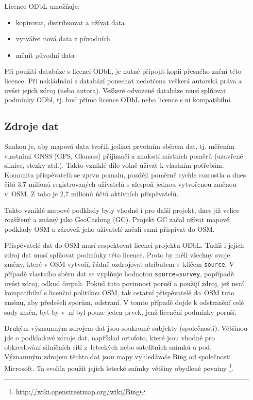 Licence ODbL umožňuje:
\begin{itemize}
    \item    kopírovat, distribuovat a užívat data
    \item    vytvářet nová data z původních
    \item    měnit původní data
\end{itemize}

Při použití databáze s licencí ODbL, je
nutné připojit kopii přesného znění této licence.
Při nakládnání s databází ponechat nedotčena veškerá autorská práva a
uvést jejich zdroj (nebo autora).
Veškeré odvozené databáze musí splňovat podmínky ODbl,
tj. buď přímo licence ODbL nebo licence s ní kompatibilní. \cite{ODbLv1}


\subsection{Zdroje dat}
\label{Zdroje dat}
Snahou je, aby mapová data tvořili jedinci prvotním
sběrem dat, tj. měřením vlastními GNSS (GPS, Glonass) přijímači a
znalostí místních poměrů (uzavřené silnice, stezky atd.).  Takto
vzniklé dílo volně užívat k vlastním potřebám. Komunita přispěvatelů se
zprvu pomalu, později poměrně rychle rozrostla a dnes čítá 3,7 milionů
registrovaných uživatelů s alespoň jednou vytvořenou změnou v~OSM. Z toho je 2,7 milionů účtů aktivních přispěvatelů.\cite{OSMstats}

Takto vzniklé mapové podklady byly vhodné i pro další projekt, dnes již
velice rozšířený a známý jako GeoCashing (GC). Projekt GC začal užívat mapové
podklady OSM a zároveň jeho uživatelé začali sami přispívat do OSM. 

Přispěvatelé dat do OSM musí respektovat licenci projektu ODbL.
Tudíž i jejich zdroj dat musí splňovat podmínky této licence.
Proto by měli
všechny svoje změny, které v OSM vytvoří, řádně ozdrojovat atributem
s~klíčem 
{\tt source}.
V případě vlastního sběru dat se vyplňuje hodnotou
{\tt source=survey},
popřípadě uvést zdroj, odkud čerpali. Pokud tuto povinnost poruší a
použijí zdroj, jež není kompatibilní s licenční politikou OSM, tak ostatní 
přispěvatelé do~OSM tuto změnu, aby předešeli sporům, odstraní. 
V tomto případě dojde k odstranění celé sady změn, byť by v~ní byl pouze jeden prvek, jenž licenční podmínky poruší.

Druhým významným zdrojem dat jsou soukromé subjekty (společnosti).
Většinou jde o podkladové zdroje dat, například ortofoto, které jsou
vhodné pro obkreslování silničních sítí z~leteckých nebo
satelitních snímků a pod.
Významným zdrojem těchto dat jsou mapy vyhledávače Bing od společnosti
Microsoft. Ta svolila použít jejich letecké snímky většiny
obydlené pevniny \footnote{\url{http://wiki.openstreetmap.org/wiki/Bing}}.

